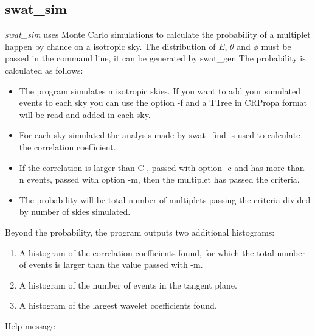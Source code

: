\documentclass[12pt]{article}
\begin{document}
\subsection{swat\_sim}
{\it swat\_sim} uses Monte Carlo simulations to calculate the probability of a
multiplet happen by chance on a isotropic sky. The distribution of $E$, $\theta$
and $\phi$ must be passed in the command line, it can be generated by swat\_gen The
probability is calculated as follows: 
\begin{itemize}
\item The program simulates n isotropic skies. If you want to add your simulated events
to each sky you can use the option -f and a TTree in CRPropa format will be read
and added in each sky.
\item For each sky simulated the analysis made by swat\_find is used to calculate the
correlation coefficient. 
\item If the correlation is larger than C , passed with option -c and has more than n events, passed 
with option -m, then the multiplet has passed the criteria.
\item The probability will be total number of multiplets passing the criteria divided by 
number of skies simulated.
\end{itemize}

Beyond the probability, the program outputs two additional histograms:
\begin{enumerate}
\item A histogram of the correlation coefficients found, for which the total number
of events is larger than the value passed with -m.
\item A histogram of the number of events in the tangent plane.
\item A histogram of the largest wavelet coefficients found.
\end{enumerate}

Help message
\end{document}
